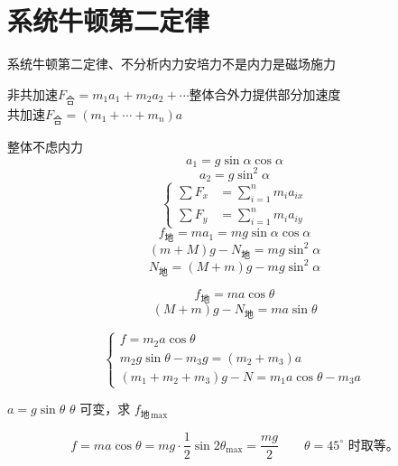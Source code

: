 \section{系统牛顿第二定律}
\noindent 系统牛顿第二定律、不分析内力\quad 安培力\quad 不是内力是磁场施力

\noindent 非共加速\quad $F_{\text{合}}=m_1a_1+m_2a_2+\cdots$\quad 整体合外力提供部分加速度 \\
共加速\quad $F_{\text{合}}=(m_1+\cdots+m_n)a$

整体不虑内力
\[ a_1=g\sin\alpha\cos\alpha \] %
\[ a_2=g\sin^2\alpha \]
\[ \left\{\begin{aligned} \sum F_x&=\sum_{i=1}^{n}m_ia_{ix}\\ \sum F_y&=\sum_{i=1}^{n}m_ia_{iy} \end{aligned}\right. \]
\[ f_{\text{地}}=ma_1=mg\sin\alpha\cos\alpha \]
\[ (m+M)g-N_{\text{地}}=mg\sin^2\alpha \]
\[ N_{\text{地}}=(M+m)g-mg\sin^2\alpha \] %

\begin{problem}
\begin{solution}
\[ f_{\text{地}}=ma\cos\theta \]
\[ (M+m)g-N_{\text{地}}=ma\sin\theta \]
\end{solution}
\end{problem}

\begin{problem}
\begin{solution}
\[ \begin{cases} f=m_2a\cos\theta\\ m_2g\sin\theta-m_3g=(m_2+m_3)a\\ (m_1+m_2+m_3)g-N=m_1a\cos\theta-m_3a\end{cases} \]
\end{solution}
\end{problem}

\begin{problem}
$a=g\sin\theta$
$\theta$ 可变，求 $f_{\text{地}\,\max}$
\begin{solution}
\[ f=ma\cos\theta=mg\cdot\frac12\sin2\theta_{\max}=\frac{mg}{2}\qquad \theta=45^\circ\text{ 时取等。} \]
\end{solution}
\end{problem}

